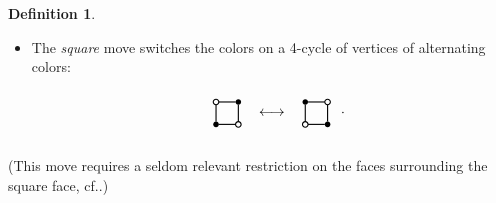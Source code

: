\documentclass[10pt]{amsart}
\theoremstyle{definition}
\newtheorem{definition}[theorem]{Definition}
\newcommand{\cf}{cf.}
\begin{document}
\begin{definition}
\begin{itemize}
\[\begin{picture}
\put(20,12.5){\line(0,1){15}}
\put(20,10){\circle{5}}
\put(20,30){\circle{5}}
\end{picture}
\begin{picture}(40,40)(0,0)
\thicklines
\put(20,20){\makebox(0,0){$\longleftrightarrow$}}
\end{picture}
\begin{picture}(40,40)(0,0)
\thicklines
\put(0,0){\line(1,2){9}}
\put(40,40){\line(-1,-2){9}}
\put(40,0){\line(-1,2){9}}
\put(0,40){\line(1,-2){9}}
\put(12.5,20){\line(1,0){15}}
\put(10,20){\circle{5}}
\put(30,20){\circle{5}}
\put(42,20){.}
\end{picture}
\]

\item The \emph{square} move switches the colors on a 4-cycle of
 vertices of alternating colors:
\[
\setlength{\unitlength}{0.8pt}
\begin{picture}(40,45)(0,0)
\thicklines
\put(0,0){\line(1,1){8.5}}
\put(40,40){\line(-1,-1){8.5}}
\put(0,40){\line(1,-1){8.5}}
\put(40,0){\line(-1,1){8.5}}
\put(10,12.5){\line(0,1){15}}
\put(30,12.5){\line(0,1){15}}
\put(12.5,10){\line(1,0){15}}
\put(12.5,30){\line(1,0){15}}
\put(10,10){\circle*{5}}
\put(10,30){\circle{5}}
\put(30,10){\circle{5}}
\put(30,30){\circle*{5}}
\end{picture}
\begin{picture}(40,40)(0,0)
\thicklines
\put(20,20){\makebox(0,0){$\longleftrightarrow$}}
\end{picture}
\begin{picture}(40,40)(0,0)
\thicklines
\put(0,0){\line(1,1){8.5}}
\put(40,40){\line(-1,-1){8.5}}
\put(0,40){\line(1,-1){8.5}}
\put(40,0){\line(-1,1){8.5}}
\put(10,12.5){\line(0,1){15}}
\put(30,12.5){\line(0,1){15}}
\put(12.5,10){\line(1,0){15}}
\put(12.5,30){\line(1,0){15}}
\put(10,10){\circle{5}}
\put(10,30){\circle*{5}}
\put(30,10){\circle*{5}}
\put(30,30){\circle{5}}
\put(42,20){.}
\end{picture}
\]
\end{itemize}
(This move requires a seldom relevant restriction on the faces surrounding the square face, 
\cf \cite[Restriction~6.3]{FPST}.) 
\end{definition}
\end{document}
